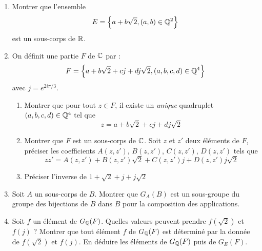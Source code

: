 \begin{enumerate}
\item  Montrer que l'ensemble 
\begin{displaymath}
 E= \left\lbrace a+b\sqrt{2} , (a,b)\in\mathbb{Q}^2 \right\rbrace 
\end{displaymath}
est un sous-corps de $\mathbb{R}$.

\item On définit une partie $F$ de $\mathbb{C}$ par : 
\begin{displaymath}
 F = \left\lbrace a+b\sqrt{2}+cj+dj\sqrt{2} , (a,b,c,d)\in\mathbb{Q}^4 \right\rbrace 
\end{displaymath}
avec $j=e^{2i\pi /3}$.
\begin{enumerate}
 \item Montrer que pour tout $z\in F$, il existe un \emph{unique} quadruplet $(a,b,c,d)\in\mathbb{Q}^4$ tel que
\begin{displaymath}
 z= a +b\sqrt{2}+cj+dj\sqrt{2}
\end{displaymath}
\item Montrer que $F$ est un sous-corps de $\mathbb{C}$. Soit $z$ et $z'$ deux éléments de $F$, préciser les coefficients  $A(z,z')$, $B(z,z')$, $C(z,z')$, $D(z,z')$ tels que
\begin{displaymath}
 zz' = A(z,z') + B(z,z')\sqrt{2} + C(z,z')j + D(z,z')j\sqrt{2} 
\end{displaymath}
\item Préciser l'inverse de $1+\sqrt{2}+j+j\sqrt{2}$
\end{enumerate}

\item  Soit $A$ un sous-corps de $B$. Montrer que $G_A(B)$ est un sous-groupe du groupe des bijections de $B$ dans $B$ pour la composition des applications.

\item  Soit $f$ un \'{e}l\'{e}ment de $G_{\mathbb{Q}}(F)$.\newline
Quelles valeurs peuvent prendre $f(\sqrt{2})$ et $f(j)$ ? Montrer que tout \'{e}l\'{e}ment $f$ de $G_{\mathbb{Q}}(F)$ est d\'{e}termin\'{e} par la donn\'{e}e de $f(\sqrt{2})$ et $f(j)$. En d\'{e}duire les \'{e}l\'{e}ments de $G_{\mathbb{Q}}(F)$ puis de $G_E(F)$.
\end{enumerate}
